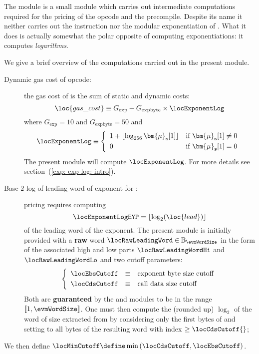 The \expMod{} module is a small module which carries out intermediate computations required for the pricing of the  opcode and the  precompile.
Despite its name it neither carries out the  instruction nor the modular exponentiation of .
What it does is actually somewhat the polar opposite of computing exponentiations: it computes \emph{logarithms}.

We give a brief overview of the computations carried out in the present module.
\begin{description}
	\item[Dynamic gas cost of  opcode:]
		the gas cost of  is the sum of static and dynamic costs:
		\[
			\loc{gas\_cost} \equiv G_\text{exp} + G_\text{expbyte} \times \locExponentLog \\
		\]
		where $G_\text{exp} = 10$ and $G_{\text{expbyte}} = 50$
		and
		\[
			\locExponentLog \equiv
			\left\{ \begin{array}{ll}
				1 + \lfloor \log_{256} \bm{\mu}_\textbf{s}[1] \rfloor & \text{if $\bm{\mu}_\textbf{s}[1] \neq 0$}  \vspace{1mm} \\
				0                                                     & \text{if $\bm{\mu}_\textbf{s}[1] = 0$}                  \\
			\end{array} \right. \\
		\]
		The present module will compute $\locExponentLog$. For more details see section~(\ref{exp: exp log: intro}).
	\item[Base $2$ log of leading word of exponent for :]
		 pricing requires computing
		\[ \locExponentLogEYP = \lfloor \log_{2}(\loc{lead}) \rfloor \]
		of the leading word of the exponent.
		The present module is initially provided with a \textbf{raw} \evm{} word
		$\locRawLeadingWord \in \mathbb{B}_{\evmWordSize}$ in the form of the associated high and low parts
		$\locRawLeadingWordHi$ and $\locRawLeadingWordLo$
		  and two cutoff parameters:
		\[
			\left\{ \begin{array}{lcl}
				\locEbsCutoff & \equiv & \text{exponent byte size cutoff} \vspace{1mm} \\
				\locCdsCutoff & \equiv & \text{call data size cutoff}                  \\
			\end{array} \right.
		\]
		Both are \textbf{guaranteed} by the \hubMod{} and \oobMod{} modules to be in the range $[\![ 1, \evmWordSize ]\!]$.
		One must then compute the (rounded up) $\log_{2}$ of the word of size \locEbsCutoff{} extracted from  by considering only the first \locCdsCutoff{} bytes of  and setting to  all bytes of the resulting word with index $\geq \locCdsCutoff{}$;
\end{description}



We then define $\locMinCutoff \define \min{(\locCdsCutoff,\locEbsCutoff)}$.
